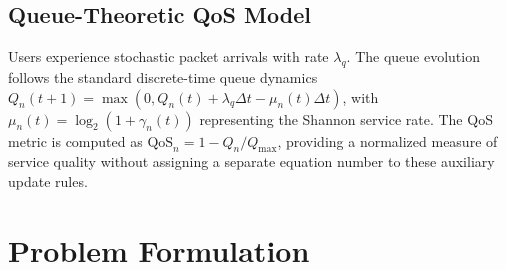 \documentclass[journal]{IEEEtran}
\begin{document}
\subsection{Queue-Theoretic QoS Model}
Users experience stochastic packet arrivals with rate $\lambda_q$. The queue evolution follows the standard discrete-time queue dynamics $Q_n(t+1)=\max(0,Q_n(t)+\lambda_q\Delta t-\mu_n(t)\Delta t)$, with $\mu_n(t)=\log_2(1+\gamma_n(t))$ representing the Shannon service rate. The QoS metric is computed as $\text{QoS}_n=1-Q_n/Q_{\max}$, providing a normalized measure of service quality without assigning a separate equation number to these auxiliary update rules.

\section{Problem Formulation}
\label{sec:problem}
\end{document}
